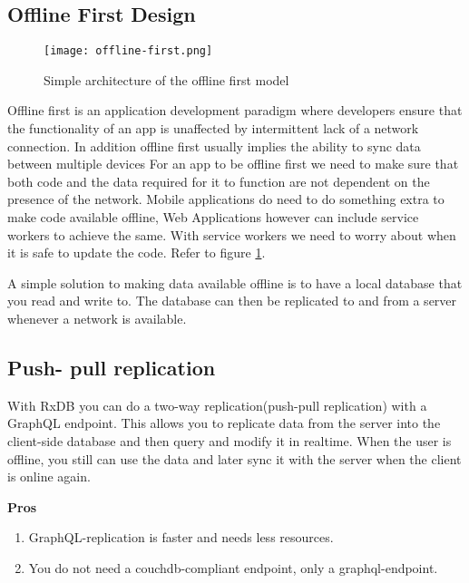 \subsection{Offline First Design}

\begin{figure}[h!]
    \begin{center}
        \texttt{[image: offline-first.png]}
    \end{center}
    \caption{Simple architecture of the offline first model}
    \label{fig:offline-first}
\end{figure}

Offline first is an application development paradigm where developers ensure that the 
functionality of an app is unaffected by intermittent lack of a network connection. 
In addition offline first usually implies the ability to sync data between multiple devices
For an app to be offline first we need to make sure that both code and the data required 
for it to function are not dependent on the presence of the network.
Mobile applications do need to do something extra to make code available offline,
Web Applications however can include service workers to achieve the same.
With service workers we need to worry about when it is safe to update the code. 
Refer to figure \ref{fig:offline-first}.

A simple solution to making data available offline is to have a local database 
that you read and write to. The database can then be replicated to and from a 
server whenever a network is available.~\cite{HasuraOfflineFirst}


\subsection{Push- pull replication}

With RxDB you can do a two-way replication(push-pull replication) with a GraphQL endpoint. 
This allows you to replicate data from the server into the client-side database and then 
query and modify it in realtime.
When the user is offline, you still can use the data and later sync it with the server 
when the client is online again.

\textbf{Pros}
\begin{enumerate}
    \item GraphQL-replication is faster and needs less resources.
    \item You do not need a couchdb-compliant endpoint, only a graphql-endpoint.
\end{enumerate}

